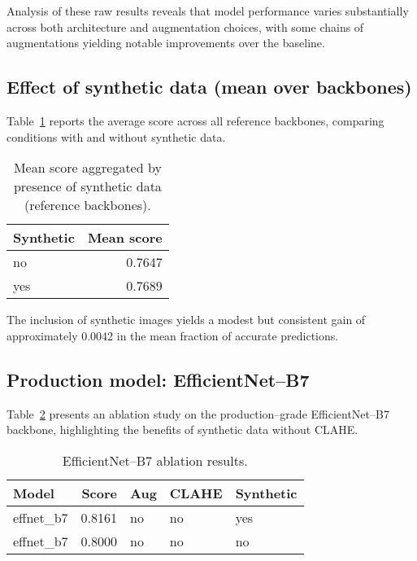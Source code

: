 \documentclass{article}
\begin{document}
Analysis of these raw results reveals that model performance varies substantially across both architecture and augmentation choices, with some chains of augmentations yielding notable improvements over the baseline.

\subsection{Effect of synthetic data (mean over backbones)}
Table~\ref{tab:synthetic} reports the average score across all reference backbones, comparing conditions with and without synthetic data.

\begin{table}[H]
    \centering
    \caption{Mean score aggregated by presence of synthetic data (reference backbones).}
    \label{tab:synthetic}
    \begin{tabular}{l r}
        \toprule
        Synthetic & Mean score \\
        \midrule
        no  & 0.7647 \\
        yes & 0.7689 \\
        \bottomrule
    \end{tabular}
\end{table}

The inclusion of synthetic images yields a modest but consistent gain of approximately 0.0042 in the mean fraction of accurate predictions.

\subsection{Production model: EfficientNet--B7}
Table~\ref{tab:effnet} presents an ablation study on the production–grade EfficientNet–B7 backbone, highlighting the benefits of synthetic data without CLAHE.

\begin{table}[H]
    \centering
    \caption{EfficientNet--B7 ablation results.}
    \label{tab:effnet}
    \begin{tabular}{l r l l l}
        \toprule
        Model      & Score  & Aug & CLAHE & Synthetic \\
        \midrule
        effnet\_b7 & 0.8161 & no  & no    & yes \\
        effnet\_b7 & 0.8000 & no  & no    & no  \\
        \bottomrule
    \end{tabular}
\end{table}
\end{document}
